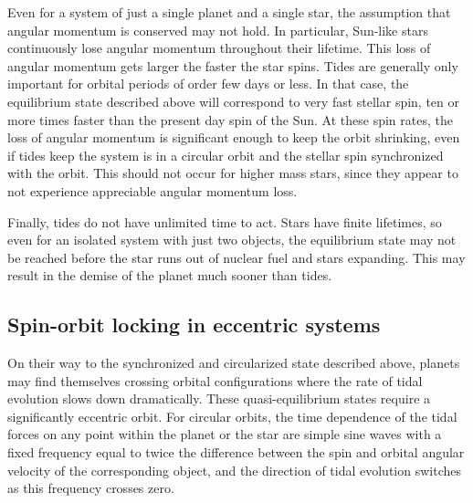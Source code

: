 Even for a system of just a single planet and a single star, the assumption that
angular momentum is conserved may not hold. In particular, Sun-like stars
continuously lose angular momentum throughout their lifetime. This loss of
angular momentum gets larger the faster the star spins. Tides are generally only
important for orbital periods of order few days or less. In that case, the
equilibrium state described above will correspond to very fast stellar spin, ten
or more times faster than the present day spin of the Sun. At these spin rates,
the loss of angular momentum is significant enough to keep the orbit shrinking,
even if tides keep the system is in a circular orbit and the stellar spin
synchronized with the orbit. This should not occur for higher mass stars, since
they appear to not experience appreciable angular momentum loss.

Finally, tides do not have unlimited time to act. Stars have finite lifetimes,
so even for an isolated system with just two objects, the equilibrium state may
not be reached before the star runs out of nuclear fuel and stars expanding.
This may result in the demise of the planet much sooner than tides.

\subsection{Spin-orbit locking in eccentric systems}

On their way to the synchronized and circularized state described above, planets
may find themselves crossing orbital configurations where the rate of tidal
evolution slows down dramatically. These quasi-equilibrium states require a
significantly eccentric orbit. For circular orbits, the time dependence of the
tidal forces on any point within the planet or the star are simple sine waves
with a fixed frequency equal to twice the difference between the spin and
orbital angular velocity of the corresponding object, and the direction of tidal
evolution switches as this frequency crosses zero.

